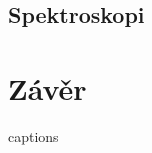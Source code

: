 \documentclass[
  digital, %
  table,   %
  lof,     %
  lot,     %
  oneside,
]{fithesis3}
\begin{document}
\section{Spektroskopi}












\chapter{Závěr}


{\csname captions\languagename\endcsname %
\makeatletter %
  \thesis@selectLocale{\thesis@locale}\makeatother
\printbibliography[heading=bibintoc]} %
\appendix %
\end{document}
